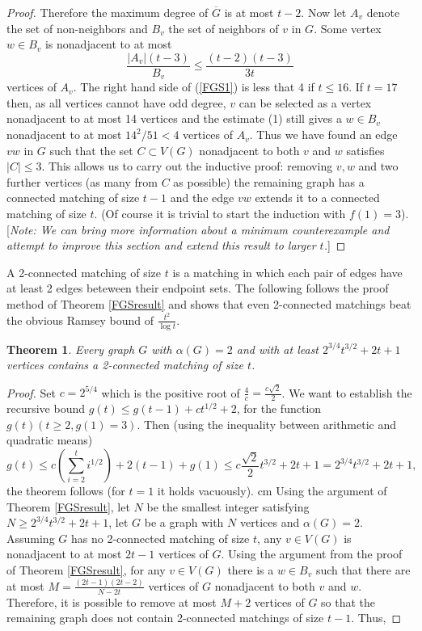 \documentclass[12 pt]{article}
\newtheorem{theorem}{Theorem}
\newcommand{\AG}{$\alpha(G) = 2$\xspace}
\begin{document}
{\begin{bibsection}[References]
\begin{biblist}[\normalsize]
\begin{proof}
Therefore the maximum degree of $\overline{G}$ is at most $t-2$.  Now let $A_v$ denote the set of non-neighbors and $B_v$ the set of neighbors of $v$ in $G$.  Some vertex $w\in B_v$ is nonadjacent to at most 
\begin{equation}\label{FGS1}
\frac{|A_v|(t-3)}{B_v}\leq \frac{(t-2)(t-3)}{3t}
\end{equation}
vertices of $A_v$.  The right hand side of (\ref{FGS1}) is less that 4 if $t\leq 16$.  If $t = 17$ then, as all vertices cannot have odd degree, $v$ can be selected as a vertex nonadjacent to at most 14 vertices and the estimate (1) still gives a $w \in B_v$ nonadjacent to at most $14^2/51 < 4$ vertices of $A_v$.  Thus we have found an edge $vw$ in $G$ such that the set $C\subset V(G)$ nonadjacent to both $v$ and $w$ satisfies $|C|\leq 3$.   This allows us to carry out the inductive proof: removing $v,w$ and two further vertices (as many from $C$ as possible) the remaining graph has a connected matching of size $t-1$ and the edge $vw$ extends it to a connected matching of size $t$.  (Of course it is trivial to start the induction with $f(1) = 3$).
[{\em Note: We can bring more information about a minimum counterexample and attempt to improve this section and extend this result to larger $t$.}]
\end{proof}
A 2-connected matching of size $t$ is a matching in which each pair of edges have at least 2 edges beteween their endpoint sets.  The following follows the proof method of Theorem \ref{FGSresult} and shows that even 2-connected matchings beat the obvious Ramsey bound of $\frac{t^2}{\log t}$.  
\begin{theorem}\label{2connmatch}
Every graph $G$ with \AG and with at least $2^{3/4}t^{3/2} + 2t + 1$ vertices contains a 2-connected matching of size $t$.  
\end{theorem}
\begin{proof}
Set $c = 2^{5/4}$ which is the positive root of $\frac{4}{c} = \frac{c\sqrt{2}}{2}$.  We want to establish the recursive bound $g(t) \leq g(t-1) + ct^{1/2}+2$, for the function $g(t)(t\geq 2, g(1) = 3)$.  Then (using the inequality between arithmetic and quadratic means)
\[g(t) \leq c(\sum_{i=2}^{t}i^{1/2}) + 2(t-1) + g(1) \leq c\frac{\sqrt{2}}{2}t^{3/2}+2t+1 = 2^{3/4}t^{3/2} + 2t + 1,\]
the theorem follows (for $t=1$ it holds vacuously).
 cm
Using the argument of Theorem \ref{FGSresult}, let $N$ be the smallest integer satisfying $N\geq 2^{3/4}t^{3/2} + 2t + 1$, let $G$ be a graph with $N$ vertices and \AG.  Assuming $G$ has no 2-connected matching of size $t$, any $v\in V(G)$ is nonadjacent to at most $2t-1$ vertices of $G$.  Using the argument from the proof of Theorem \ref{FGSresult}, for any $v\in V(G)$ there is a $w\in B_v$ such that there are at most $M=\frac{(2t-1)(2t-2)}{N-2t}$ vertices of $G$ nonadjacent to both $v$ and $w$.  Therefore, it is possible to remove at most $M+2$ vertices of $G$ so that the remaining graph does not contain 2-connected matchings of size $t-1$.  Thus,

\end{proof}
\end{biblist}
\end{bibsection}}
\end{document}
